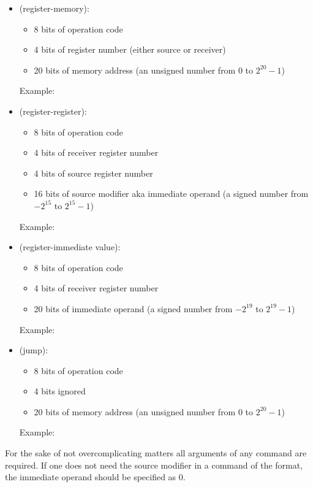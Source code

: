 \begin{itemize}
    \item {} (register-memory):

    \begin{itemize}
        \item 8 bits of operation code
        \item 4 bits of register number (either source or receiver)
        \item 20 bits of memory address (an unsigned number from $0$ to $2^{20} - 1$)
    \end{itemize}

    Example: 

    \item {} (register-register):

    \begin{itemize}
        \item 8 bits of operation code
        \item 4 bits of receiver register number
        \item 4 bits of source register number
        \item 16 bits of source modifier aka immediate operand (a signed number from $-2^{15}$ to $2^{15}-1$)
    \end{itemize}

    Example: 

    \item {} (register-immediate value):

    \begin{itemize}
        \item 8 bits of operation code
        \item 4 bits of receiver register number
        \item 20 bits of immediate operand (a signed number from $-2^{19}$ to $2^{19}-1$)
    \end{itemize}

    Example: 

    \item {} (jump):

    \begin{itemize}
        \item 8 bits of operation code
        \item 4 bits ignored
        \item 20 bits of memory address (an unsigned number from $0$ to $2^{20} - 1$)
    \end{itemize}

    Example: 

\end{itemize}

For the sake of not overcomplicating matters all arguments of any command are required.
If one does not need the source modifier in a command of the  format, the immediate operand should be specified as 0.
